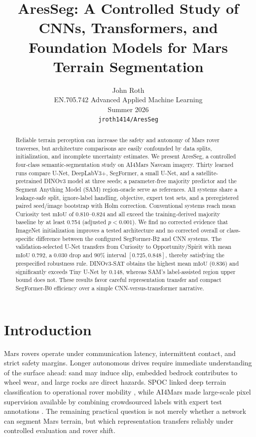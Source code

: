 \documentclass{article}
\title{AresSeg: A Controlled Study of CNNs, Transformers, and Foundation Models for Mars Terrain Segmentation}
\author{%
  John Roth\\
  EN.705.742 Advanced Applied Machine Learning\\
  Summer 2026\\
  \texttt{jroth1414/AresSeg}
}
\newcommand{\miou}{\ensuremath{\mathrm{mIoU}}}
\begin{document}
\maketitle

\begin{abstract}
Reliable terrain perception can increase the safety and autonomy of Mars rover traverses, but
architecture comparisons are easily confounded by data splits, initialization, and incomplete
uncertainty estimates. We present AresSeg, a controlled four-class semantic-segmentation study on
AI4Mars Navcam imagery. Thirty learned runs compare U-Net, DeepLabV3+, SegFormer, a small U-Net,
and a satellite-pretrained DINOv3 model at three seeds; a parameter-free majority predictor and
the Segment Anything Model (SAM) region-oracle serve as references. All systems share a
leakage-safe split, ignore-label handling, objective, expert test sets, and a preregistered paired
seed/image bootstrap with Holm correction. Conventional systems reach mean Curiosity test
\miou{} of 0.810--0.824 and all exceed the training-derived majority baseline by at least 0.754
(adjusted $p<0.001$). We find no corrected evidence that ImageNet initialization improves a tested
architecture and no corrected overall or class-specific difference between the configured
SegFormer-B2 and CNN systems. The validation-selected U-Net transfers from Curiosity to
Opportunity/Spirit with mean \miou{} 0.792, a 0.030 drop and 90\% interval $[0.725,0.848]$, thereby
satisfying the prespecified robustness rule. DINOv3-SAT obtains the highest mean \miou{} (0.836)
and significantly exceeds Tiny U-Net by 0.148, whereas SAM's label-assisted region upper bound
does not. These results favor careful representation transfer and compact SegFormer-B0 efficiency
over a simple CNN-versus-transformer narrative.
\end{abstract}

\section{Introduction}

Mars rovers operate under communication latency, intermittent contact, and strict safety margins.
Longer autonomous drives require immediate understanding of the surface ahead: sand may induce
slip, embedded bedrock contributes to wheel wear, and large rocks are direct hazards. SPOC linked
deep terrain classification to operational rover mobility \cite{rothrock2016spoc}, while AI4Mars
made large-scale pixel supervision available by combining crowdsourced labels with expert test
annotations \cite{swan2021ai4mars}. The remaining practical question is not merely whether a
network can segment Mars terrain, but which representation transfers reliably under controlled
evaluation and rover shift.
\end{document}
